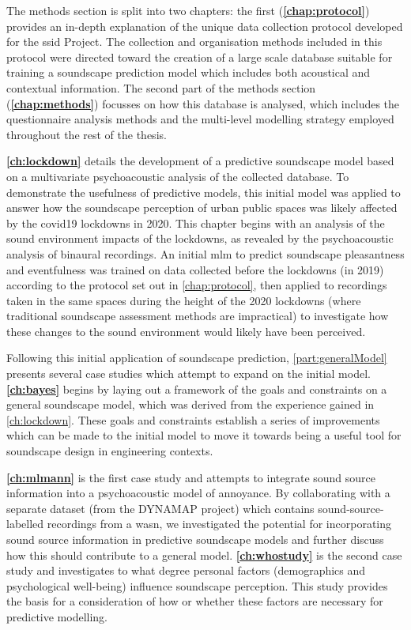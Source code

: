 The methods section is split into two chapters: the first (\textbf{\cref{chap:protocol}}) provides an in-depth explanation of the unique data collection protocol developed for the \gls{ssid} Project. The collection and organisation methods included in this protocol were directed toward the creation of a large scale database suitable for training a soundscape prediction model which includes both acoustical and contextual information. The second part of the methods section (\textbf{\cref{chap:methods}}) focusses on how this database is analysed, which includes the questionnaire analysis methods and the multi-level modelling strategy employed throughout the rest of the thesis.

\textbf{\cref{ch:lockdown}} details the development of a predictive soundscape model based on a multivariate psychoacoustic analysis of the collected database. To demonstrate the usefulness of predictive models, this initial model was applied to answer how the soundscape perception of urban public spaces was likely affected by the \gls{covid19} lockdowns in 2020. This chapter begins with an analysis of the sound environment impacts of the lockdowns, as revealed by the psychoacoustic analysis of binaural recordings. An initial \gls{mlm} to predict soundscape pleasantness and eventfulness was trained on data collected before the lockdowns (in 2019) according to the protocol set out in \cref{chap:protocol}, then applied to recordings taken in the same spaces during the height of the 2020 lockdowns (where traditional soundscape assessment methods are impractical) to investigate how these changes to the sound environment would likely have been perceived. 

Following this initial application of soundscape prediction, \cref{part:generalModel} presents several case studies which attempt to expand on the initial model. \textbf{\cref{ch:bayes}} begins by laying out a framework of the goals and constraints on a general soundscape model, which was derived from the experience gained in \cref{ch:lockdown}. These goals and constraints establish a series of improvements which can be made to the initial model to move it towards being a useful tool for soundscape design in engineering contexts. 

\textbf{\cref{ch:mlmann}} is the first case study and attempts to integrate sound source information into a psychoacoustic model of annoyance. By collaborating with a separate dataset (from the DYNAMAP project) which contains sound-source-labelled recordings from a \gls{wasn}, we investigated the potential for incorporating sound source information in predictive soundscape models and further discuss how this should contribute to a general model. \textbf{\cref{ch:whostudy}} is the second case study and investigates to what degree personal factors (demographics and psychological well-being) influence soundscape perception. This study provides the basis for a consideration of how or whether these factors are necessary for predictive modelling.


